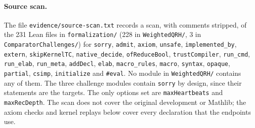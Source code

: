 \documentclass[11pt]{article}
\begin{document}
\paragraph{Source scan.}
The file \nolinkurl{evidence/source-scan.txt} records a scan, with
comments stripped, of the 231 Lean files in \nolinkurl{formalization/}
(228 in \nolinkurl{WeightedQRH/}, 3 in \nolinkurl{ComparatorChallenges/})
for \nolinkurl{sorry}, \nolinkurl{admit}, \nolinkurl{axiom},
\nolinkurl{unsafe}, \nolinkurl{implemented_by}, \nolinkurl{extern},
\nolinkurl{skipKernelTC}, \nolinkurl{native_decide},
\nolinkurl{ofReduceBool}, \nolinkurl{trustCompiler},
\nolinkurl{run_cmd}, \nolinkurl{run_elab}, \nolinkurl{run_meta},
\nolinkurl{addDecl}, \nolinkurl{elab}, \nolinkurl{macro_rules},
\nolinkurl{macro}, \nolinkurl{syntax}, \nolinkurl{opaque},
\nolinkurl{partial}, \nolinkurl{csimp}, \nolinkurl{initialize} and
\texttt{\#eval}. No module in \nolinkurl{WeightedQRH/} contains any of
them. The three challenge modules contain \nolinkurl{sorry} by design,
since their statements are the targets. The only options set are
\nolinkurl{maxHeartbeats} and \nolinkurl{maxRecDepth}. The scan does not
cover the original development or Mathlib; the axiom checks and kernel
replays below cover every declaration that the endpoints use.
\end{document}
